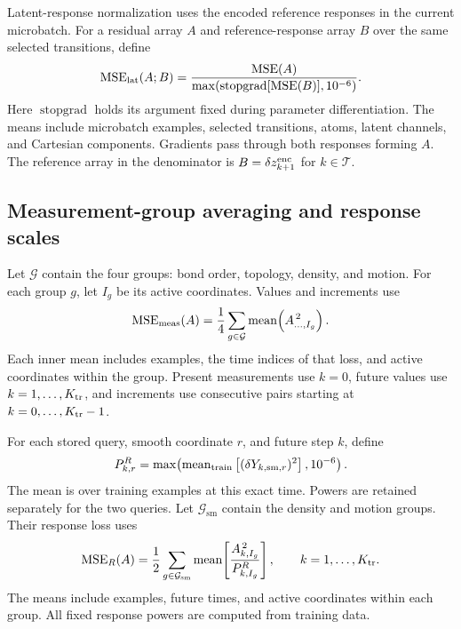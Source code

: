 \documentclass[11pt,a4paper]{article}
\numberwithin{equation}{section}
\newcommand{\MSE}{\operatorname{MSE}}
\newcommand{\sg}{\operatorname{stopgrad}}
\newcommand{\mean}{\operatorname{mean}}
\newcommand{\sm}{\mathrm{sm}}
\begin{document}
Latent-response normalization uses the encoded reference responses in the
current microbatch. For a residual array $A$ and reference-response array $B$
over the same selected transitions, define
\begin{equation}
\MSE_{\rm lat}(A;B)=
\frac{\MSE(A)}{\max\!\left(\sg[\MSE(B)],10^{-6}\right)}.
\end{equation}
Here $\sg$ holds its argument fixed during parameter differentiation.
The means include microbatch examples, selected transitions, atoms, latent
channels, and Cartesian components. Gradients pass through both responses
forming $A$. The reference array in the denominator is
$B=\delta z_{k+1}^{\rm enc}$ for $k\in\mathcal T$.

\subsection{Measurement-group averaging and response scales}

Let $\mathcal G$ contain the four groups: bond order, topology, density,
and motion. For each group $g$, let $I_g$ be its active coordinates. Values
and increments use
\begin{equation}
\MSE_{\rm meas}(A)=\frac14\sum_{g\in\mathcal G}
\mean\!\left(A_{\ldots,I_g}^{\,2}\right).
\end{equation}
Each inner mean includes examples, the time indices of that loss, and active
coordinates within the group. Present measurements use $k=0$, future values
use $k=1,\ldots,K_{\rm tr}$, and increments use consecutive pairs starting
at $k=0,\ldots,K_{\rm tr}-1$.

For each stored query, smooth coordinate $r$, and future step $k$, define
\begin{equation}
P^R_{k,r}=\max\!\left(
\mean_{\rm train}\left[(\delta Y_{k,\sm,r})^2\right],10^{-6}\right).
\end{equation}
The mean is over training examples at this exact time. Powers are retained
separately for the two queries. Let $\mathcal G_{\sm}$ contain the density
and motion groups. Their response loss uses
\begin{equation}
\MSE_R(A)=\frac12\sum_{g\in\mathcal G_{\sm}}
\mean\!\left[\frac{A_{k,I_g}^{\,2}}{P^R_{k,I_g}}\right],
\qquad k=1,\ldots,K_{\rm tr}.
\end{equation}
The means include examples, future times, and active coordinates within
each group. All fixed response powers are computed from training data.
\end{document}
